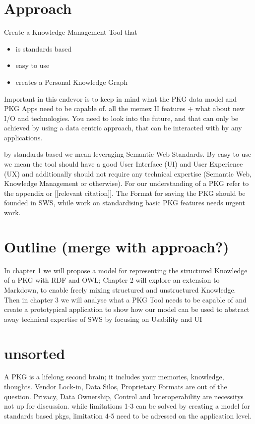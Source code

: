 \section{Approach}

Create a Knowledge Management Tool that

\begin{itemize}
    \item is standards based
    \item easy to use
    \item creates a Personal Knowledge Graph
\end{itemize}

Important in this endevor is to keep in mind what the PKG data model and PKG Apps need to be capable of. all the memex II features + what about new I/O and technologies. You need to look into the future, and that can only be achieved by using a data centric approach, that can be interacted with by any applications.

by standards based we mean leveraging Semantic Web Standards. By easy to use we mean the tool should have a good User Interface (UI) and User Experience (UX) and additionally should not require any technical expertise (Semantic Web, Knowledge Management or otherwise). For our understanding of a PKG refer to the appendix or [[relevant citation]]. The Format for saving the PKG should be founded in SWS, while work on standardising basic PKG features needs urgent work.

\section{Outline (merge with approach?)}
In chapter 1 we will propose a model for representing the structured Knowledge of a PKG with RDF and OWL; Chapter 2 will explore an extension to Markdown, to enable freely mixing structured and unstructured Knowledge. Then in chapter 3 we will analyse what a PKG Tool needs to be capable of and create a prototypical application to show how our model can be used to abstract away technical expertise of SWS by focusing on Usability and UI

\section{unsorted}
A PKG is a lifelong second brain; it includes your memories, knowledge, thoughts. Vendor Lock-in, Data Silos, Proprietary Formats are out of the question. Privacy, Data Ownership, Control and Interoperability are necessitys not up for discussion.
while limitations 1-3 can be solved by creating a model for standards based pkgs, limitation 4-5 need to be adressed on the application level.

